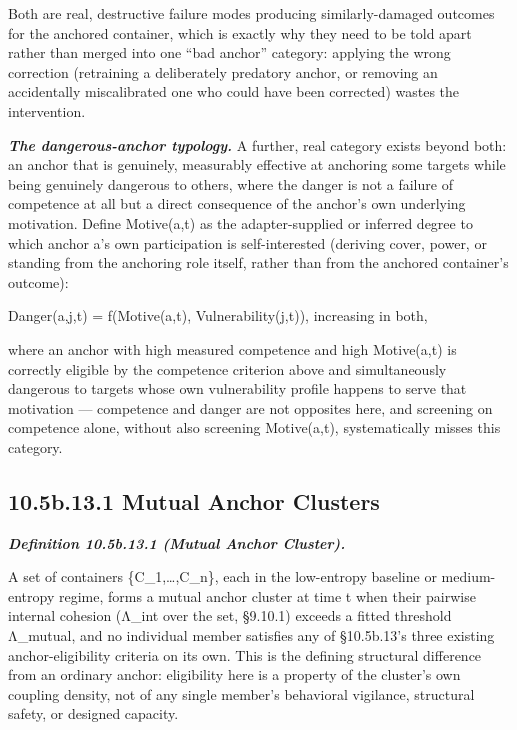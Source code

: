 \documentclass[
]{article}
\begin{document}
Both are real, destructive failure modes producing similarly-damaged
outcomes for the anchored container, which is exactly why they need to
be told apart rather than merged into one ``bad anchor'' category:
applying the wrong correction (retraining a deliberately predatory
anchor, or removing an accidentally miscalibrated one who could have
been corrected) wastes the intervention.

\emph{\textbf{The dangerous-anchor typology.}} A further, real category
exists beyond both: an anchor that is genuinely, measurably effective at
anchoring some targets while being genuinely dangerous to others, where
the danger is not a failure of competence at all but a direct
consequence of the anchor's own underlying motivation. Define
Motive(a,t) as the adapter-supplied or inferred degree to which anchor
a's own participation is self-interested (deriving cover, power, or
standing from the anchoring role itself, rather than from the anchored
container's outcome):

Danger(a,j,t) = f(Motive(a,t), Vulnerability(j,t)), increasing in both,

where an anchor with high measured competence and high Motive(a,t) is
correctly eligible by the competence criterion above and simultaneously
dangerous to targets whose own vulnerability profile happens to serve
that motivation --- competence and danger are not opposites here, and
screening on competence alone, without also screening Motive(a,t),
systematically misses this category.

\hypertarget{b.13.1-mutual-anchor-clusters}{%
\subsection{10.5b.13.1 Mutual Anchor
Clusters}\label{b.13.1-mutual-anchor-clusters}}

\emph{\textbf{Definition 10.5b.13.1 (Mutual Anchor Cluster).}}

A set of containers \{C\_1,\ldots,C\_n\}, each in the low-entropy
baseline or medium-entropy regime, forms a mutual anchor cluster at time
t when their pairwise internal cohesion (Λ\_int over the set, §9.10.1)
exceeds a fitted threshold Λ\_mutual, and no individual member satisfies
any of §10.5b.13's three existing anchor-eligibility criteria on its
own. This is the defining structural difference from an ordinary anchor:
eligibility here is a property of the cluster's own coupling density,
not of any single member's behavioral vigilance, structural safety, or
designed capacity.
\end{document}
